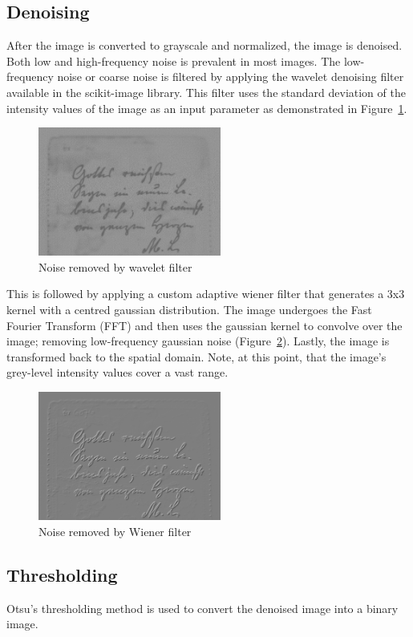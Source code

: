 \documentclass[a4paper, 12pt]{report}
\begin{document}
\subsection{Denoising}
After the image is converted to grayscale and normalized, the image is
denoised. Both low and high-frequency noise is prevalent in most images. The
low-frequency noise or coarse noise is filtered by applying the wavelet
denoising filter available in the scikit-image library. This filter uses the
standard deviation of the intensity values of the image as an input parameter
as demonstrated in Figure~\ref{fig:2}.

\begin{figure}[ht]
    \centering
    \includegraphics[width=6cm]{wavelet difference.png}
    \caption{Noise removed by wavelet filter}
    \label{fig:2}
\end{figure}

This is followed by applying a custom adaptive wiener filter that generates a
3x3 kernel with a centred gaussian distribution. The image undergoes the Fast
Fourier Transform (FFT) and then uses the gaussian kernel to convolve over the
image; removing low-frequency gaussian noise (Figure~\ref{fig:3}). Lastly, the
image is transformed back to the spatial domain. Note, at this point, that the
image's grey-level intensity values cover a vast range.

\begin{figure}[ht]
    \centering
    \includegraphics[width=6cm]{wiener difference.png}
    \caption{Noise removed by Wiener filter}
    \label{fig:3}
\end{figure}

\subsection{Thresholding}
Otsu's thresholding method is used to convert the denoised image into a binary
image.
\end{document}

